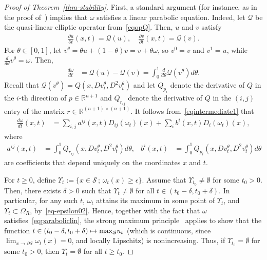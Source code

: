 \documentclass{amsart}[12pt]
\newcommand{\cS}{\mathcal{S}}
\newcommand{\es}{\emptyset}
\theoremstyle{definition}
\theoremstyle{plain}
\newcommand{\R}{\mathbb{R} }
\renewcommand{\Omega}{\varOmega}
\begin{document}
\begin{proof}[Proof of Theorem~\ref{thm-stability}]
First, a standard argument
(for instance, as in the proof of~\cite[Theorem 17.1]{GT})
implies that $\omega$ satisfies a linear parabolic equation. Indeed,
let $\mathcal{Q}$ be the quasi-linear elliptic operator
from~\eqref{eqopQ}. Then, $u$ and $v$ satisfy
\begin{align*}
\frac{\partial u}{\partial t}(x,t)=\mathcal Q(u),\quad
\frac{\partial v}{\partial t}(x,t)=\mathcal Q(v).
\end{align*}
For $\theta\in[0,1]$, let $v^\theta = \theta u+(1-\theta)v
= v + \theta \omega$, so $v^0 = v$ and $v^1 = u$,
while $\frac{d}{d\theta}v^\theta = \omega$.
Then,
\begin{align}\label{eqintermediate1}
\frac{d \omega}{d t} & = \mathcal Q(u)-\mathcal Q(v)
 = \int_0^1 \frac{d}{d\theta} \mathcal Q (v^\theta)d\theta.
\end{align}
Recall that
$\mathcal Q (v^\theta) =
Q(x,Dv^\theta_t,D^2v^\theta_t)$ and let $Q_{p_i}$
denote the derivative of
$Q$ in the $i$-th direction of $p\in \R^{n+1}$ and
$Q_{r_{ij}}$ denote the derivative of $Q$ in the $(i,j)$ entry
of the matrix $r\in \R^{(n+1)\times(n+1)}$.
It follows from~\eqref{eqintermediate1} that
\begin{align}\label{eqparaboliclin}
\frac{d \omega}{d t}(x,t) & = \sum_{i,j} a^{ij}(x,t)D_{ij}(\omega_t)(x)
+\sum_i b^i(x,t) D_i(\omega_t)(x),
\end{align}
where
\begin{align*}
a^{ij}(x,t)
&= \int_0^1 Q_{r_{ij}}(x,Dv^\theta_t,D^2v^\theta_t)d\theta,&
b^{i}(x,t)
&= \int_0^1 Q_{p_{i}}(x,Dv^\theta_t,D^2v^\theta_t)d\theta
\end{align*}
are coefficients that depend uniquely on the coordinates $x$ and
$t$.



For $t\ge 0$, define
$\Upsilon_t:=\{x\in\mathcal S\,;\, \omega_t(x)\ge \epsilon\}$.
Assume that $\Upsilon_{t_0}\neq \es$ for some $t_0>0$.
Then,
there exists $\delta>0$ such that $\Upsilon_t\neq \es$
for all $t\in(t_0-\delta,t_0+\delta)$. In particular, for any such
$t$, $\omega_t$ attains
its maximum in some point of $\Upsilon_t$, and
$\Upsilon_t\subset\Omega_{R}$, by~\eqref{eq-epsilon02}.
Hence, together with the fact that
$\omega$ satisfies~\eqref{eqparaboliclin}, the strong maximum
principle~\cite[Theorem 2.1.1]{mantegazza}
applies to show that the function
$t\in (t_0-\delta,t_0+\delta)\mapsto {\rm max}_\cS u_t$
(which is continuous, since $\lim_{x\to \partial \cS} \omega_t(x) = 0$,
and locally Lipschitz)
is nonincreasing. Thus, if
$\Upsilon_{t_0} = \emptyset$ for some $t_0>0$, then $\Upsilon_{t} =
\emptyset$ for all $t\geq t_0$.


\end{proof}
\end{document}
